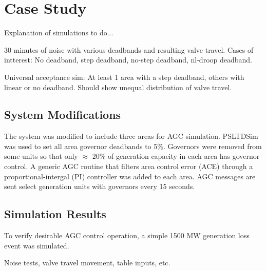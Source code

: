 \section{Case Study}
Explanation of simulations to do...

30 minutes of noise with various deadbands and resulting valve travel.
Cases of intterest:
No deadband, step deadband, no-step deadband, nl-droop deadband.

Universal acceptance sim:
At least 1 area with a step deadband, others with linear or no deadband.
Should show unequal distribution of valve travel.

\subsection{System Modifications}
The system was modified to include three areas for AGC simulation.
PSLTDSim was used to set all area governor deadbands to 5\%.
Governors were removed from some units so that only $\approx$ 20\% of generation capacity in each area has governor control.
A generic AGC routine that filters area control error (ACE) through a proportional-intergal (PI)  controller was added to each area.
AGC messages are sent select generation units with governors every 15 seconds.

\subsection{Simulation Results}
To verify desirable AGC control operation, a simple 1500 MW generation loss event was simulated.


Noise tests, valve travel movement, table inputs, etc.